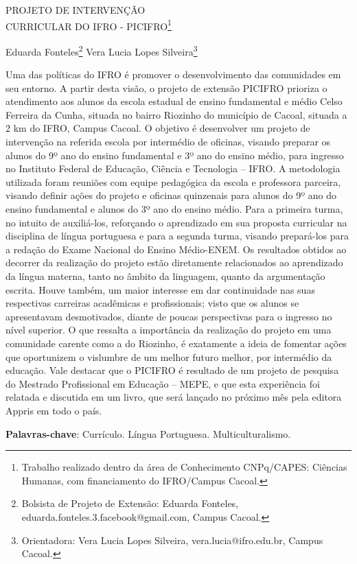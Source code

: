 \documentclass[article,12pt,onesidea,4paper,english,brazil]{abntex2}
\begin{document}
	
	
	\frenchspacing 
	
	\begin{center}
		\LARGE PROJETO DE INTERVENÇÃO \\CURRICULAR DO IFRO - PICIFRO\footnote{Trabalho realizado dentro da área de Conhecimento CNPq/CAPES: Ciências Humanas, com financiamento do IFRO/Campus Cacoal. }
		
		\normalsize
		Eduarda Fonteles\footnote{Bolsista de Projeto de Extensão: Eduarda Fonteles,  eduarda.fonteles.3.facebook@gmail.com, Campus Cacoal.} 
		Vera Lucia Lopes Silveira\footnote{Orientadora: Vera Lucia Lopes Silveira, vera.lucia@ifro.edu.br, Campus Cacoal.} 
	\end{center}
	
	\noindent Uma das políticas do IFRO é promover o desenvolvimento das comunidades em seu entorno. A partir desta visão, o projeto de extensão PICIFRO prioriza o atendimento aos alunos da escola estadual de ensino fundamental e médio Celso Ferreira da Cunha, situada no bairro Riozinho do município de Cacoal, situada a 2 km do IFRO, Campus Cacoal. O objetivo é desenvolver um projeto de intervenção na referida escola por intermédio de oficinas, visando preparar os alunos do 9º ano do ensino fundamental e 3º ano do ensino médio, para ingresso no Instituto Federal de Educação, Ciência e Tecnologia – IFRO.  A metodologia utilizada foram reuniões com equipe pedagógica da escola e professora parceira, visando definir ações do projeto e oficinas quinzenais para alunos do 9º ano do ensino fundamental e alunos do 3º ano do ensino médio. Para a primeira turma, no intuito de auxiliá-los, reforçando o aprendizado em sua proposta curricular na disciplina de língua portuguesa e para a segunda turma, visando prepará-los para a redação do Exame Nacional do Ensino Médio-ENEM. 
	Os resultados obtidos ao decorrer da realização do projeto estão diretamente relacionados ao aprendizado da língua materna, tanto no âmbito da linguagem, quanto da argumentação escrita. Houve também, um maior interesse em dar continuidade nas suas respectivas carreiras acadêmicas e profissionais; visto que os alunos se apresentavam desmotivados, diante de poucas perspectivas para o ingresso no nível superior. O que ressalta a importância da realização do projeto em uma comunidade carente como a do Riozinho, é exatamente a ideia de fomentar ações que oportunizem o vislumbre de um melhor futuro melhor, por intermédio da educação. 
	Vale destacar que o PICIFRO é resultado de um projeto de pesquisa do Mestrado Profissional em Educação – MEPE, e que esta experiência foi relatada e discutida em um livro, que será lançado no próximo mês pela editora Appris em todo o país.
	
	
	\vspace{\onelineskip}
	
	\noindent
	\textbf{Palavras-chave}: Currículo. Língua Portuguesa. Multiculturalismo.
	
\end{document}
